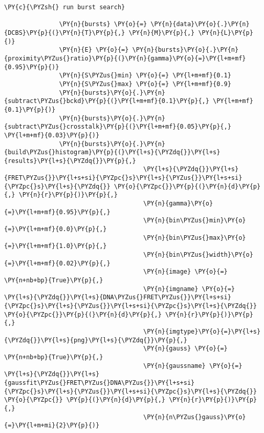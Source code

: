 \begin{Verbatim}[commandchars=\\\{\}, fontsize=\scriptsize]
               \PY{c}{\PYZsh{} run burst search}
       
               \PY{n}{bursts} \PY{o}{=} \PY{n}{data}\PY{o}{.}\PY{n}{DCBS}\PY{p}{(}\PY{n}{T}\PY{p}{,} \PY{n}{M}\PY{p}{,} \PY{n}{L}\PY{p}{)}
               \PY{n}{E} \PY{o}{=} \PY{n}{bursts}\PY{o}{.}\PY{n}{proximity\PYZus{}ratio}\PY{p}{(}\PY{n}{gamma}\PY{o}{=}\PY{l+m+mf}{0.95}\PY{p}{)}
               \PY{n}{S\PYZus{}min} \PY{o}{=} \PY{l+m+mf}{0.1}
               \PY{n}{S\PYZus{}max} \PY{o}{=} \PY{l+m+mf}{0.9}
               \PY{n}{bursts}\PY{o}{.}\PY{n}{subtract\PYZus{}bckd}\PY{p}{(}\PY{l+m+mf}{0.1}\PY{p}{,} \PY{l+m+mf}{0.1}\PY{p}{)}
               \PY{n}{bursts}\PY{o}{.}\PY{n}{subtract\PYZus{}crosstalk}\PY{p}{(}\PY{l+m+mf}{0.05}\PY{p}{,} \PY{l+m+mf}{0.03}\PY{p}{)}
               \PY{n}{bursts}\PY{o}{.}\PY{n}{build\PYZus{}histogram}\PY{p}{(}\PY{l+s}{\PYZdq{}}\PY{l+s}{results}\PY{l+s}{\PYZdq{}}\PY{p}{,} 
                                      \PY{l+s}{\PYZdq{}}\PY{l+s}{FRET\PYZus{}}\PY{l+s+si}{\PYZpc{}s}\PY{l+s}{\PYZus{}}\PY{l+s+si}{\PYZpc{}s}\PY{l+s}{\PYZdq{}} \PY{o}{\PYZpc{}}\PY{p}{(}\PY{n}{d}\PY{p}{,} \PY{n}{r}\PY{p}{)}\PY{p}{,} 
                                      \PY{n}{gamma}\PY{o}{=}\PY{l+m+mf}{0.95}\PY{p}{,} 
                                      \PY{n}{bin\PYZus{}min}\PY{o}{=}\PY{l+m+mf}{0.0}\PY{p}{,} 
                                      \PY{n}{bin\PYZus{}max}\PY{o}{=}\PY{l+m+mf}{1.0}\PY{p}{,} 
                                      \PY{n}{bin\PYZus{}width}\PY{o}{=}\PY{l+m+mf}{0.02}\PY{p}{,} 
                                      \PY{n}{image} \PY{o}{=} \PY{n+nb+bp}{True}\PY{p}{,} 
                                      \PY{n}{imgname} \PY{o}{=} \PY{l+s}{\PYZdq{}}\PY{l+s}{DNA\PYZus{}FRET\PYZus{}}\PY{l+s+si}{\PYZpc{}s}\PY{l+s}{\PYZus{}}\PY{l+s+si}{\PYZpc{}s}\PY{l+s}{\PYZdq{}} \PY{o}{\PYZpc{}}\PY{p}{(}\PY{n}{d}\PY{p}{,} \PY{n}{r}\PY{p}{)}\PY{p}{,} 
                                      \PY{n}{imgtype}\PY{o}{=}\PY{l+s}{\PYZdq{}}\PY{l+s}{png}\PY{l+s}{\PYZdq{}}\PY{p}{,} 
                                      \PY{n}{gauss} \PY{o}{=} \PY{n+nb+bp}{True}\PY{p}{,} 
                                      \PY{n}{gaussname} \PY{o}{=} \PY{l+s}{\PYZdq{}}\PY{l+s}{gaussfit\PYZus{}FRET\PYZus{}DNA\PYZus{}}\PY{l+s+si}{\PYZpc{}s}\PY{l+s}{\PYZus{}}\PY{l+s+si}{\PYZpc{}s}\PY{l+s}{\PYZdq{}} \PY{o}{\PYZpc{}} \PY{p}{(}\PY{n}{d}\PY{p}{,} \PY{n}{r}\PY{p}{)}\PY{p}{,} 
                                      \PY{n}{n\PYZus{}gauss}\PY{o}{=}\PY{l+m+mi}{2}\PY{p}{)}
               
\end{Verbatim}

